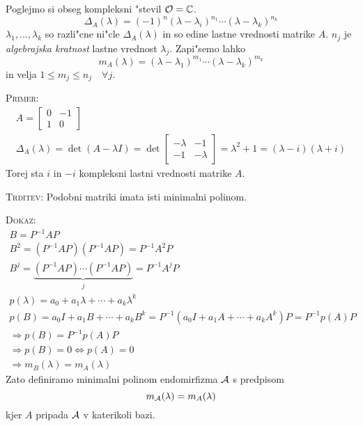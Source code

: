 Poglejmo si obseg kompleksni "stevil $\mathcal{O} = \mathbb{C}$.
\begin{equation*}
\Delta_A(\lambda) = (-1)^n (\lambda - \lambda_i)^{n_1} \cdots (\lambda - \lambda_k)^{n_k}
\end{equation*}
$\lambda_1, \ldots, \lambda_k$ so razli"cne ni"cle $\Delta_A(\lambda)$ in so edine lastne vrednosti matrike $A$. $n_j$ je \emph{algebrajska kratnost} lastne vrednost $\lambda_j$. Zapi"semo lahko
\begin{equation*}
m_A(\lambda) = (\lambda - \lambda_1)^{m_1} \cdots (\lambda - \lambda_k)^{m_k}
\end{equation*}
in velja $1 \leq m_j \leq n_j \quad \forall j$.

\textsc{Primer:}
\begin{gather*}
A = \begin{bmatrix}
0 & -1 \\
1 & 0
\end{bmatrix}  \\
\Delta_A(\lambda) = \det (A - \lambda I) = \det \begin{bmatrix}
-\lambda & -1 \\
-1 & - \lambda
 \end{bmatrix} = \lambda^2 + 1 = (\lambda - i) (\lambda + i)
\end{gather*}
Torej sta $i$ in $-i$ kompleksni lastni vrednosti matrike $A$.

\textsc{Trditev:} Podobni matriki imata isti minimalni polinom.

\textsc{Dokaz:} 
\begin{gather*}
B = P^{-1} AP \\
B^2 = (P^{-1}AP)(P^{-1}AP) = P^{-1} A^2 P \\
B^j = \underbrace{(P^{-1}AP) \cdots (P^{-1}AP)}_j = P^{-1}A^jP \\
p(\lambda) = a_0 + a_1 \lambda + \cdots + a_k \lambda^k \\
p(B) = a_0 I + a_1 B + \cdots + a_k B^k = P^{-1} (a_0 I + a_1 A + \cdots + a_k A^k) P = P^{-1}p(A)P \\
\Rightarrow p(B) = P^{-1}p(A)P \\
\Rightarrow p(B) = 0 \iff p(A) = 0 \\
\Rightarrow m_B(\lambda) = m_A(\lambda)
\end{gather*}
Zato definiramo minimalni polinom endomirfizma $\mathcal{A}$ s predpisom
\begin{equation*}
m_{\mathcal{A}} (\lambda) = m_A(\lambda)
\end{equation*}
kjer $A$ pripada $\mathcal{A}$ v katerikoli bazi.

